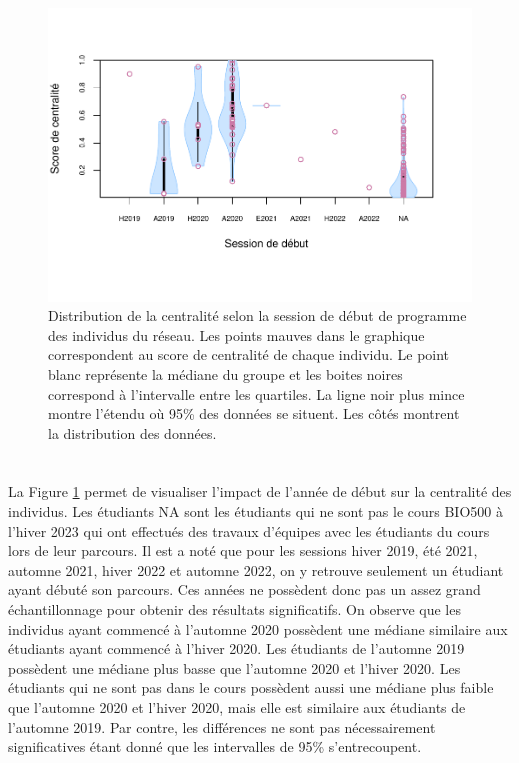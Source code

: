 \documentclass[preprint, 3p,
authoryear]{elsarticle} %
\begin{document}
\begin{figure}
\centering
\includegraphics{rapport_files/figure-latex/unnamed-chunk-2-1.pdf}
\caption{\label{fig:plot2}Distribution de la centralité selon la session
de début de programme des individus du réseau. Les points mauves dans le
graphique correspondent au score de centralité de chaque individu. Le
point blanc représente la médiane du groupe et les boites noires
correspond à l'intervalle entre les quartiles. La ligne noir plus mince
montre l'étendu où 95\% des données se situent. Les côtés montrent la
distribution des données.}
\end{figure}

\hypertarget{section-3}{%
\section{}\label{section-3}}

La Figure \ref{fig:plot2} permet de visualiser l'impact de l'année de
début sur la centralité des individus. Les étudiants NA sont les
étudiants qui ne sont pas le cours BIO500 à l'hiver 2023 qui ont
effectués des travaux d'équipes avec les étudiants du cours lors de leur
parcours. Il est a noté que pour les sessions hiver 2019, été 2021,
automne 2021, hiver 2022 et automne 2022, on y retrouve seulement un
étudiant ayant débuté son parcours. Ces années ne possèdent donc pas un
assez grand échantillonnage pour obtenir des résultats significatifs. On
observe que les individus ayant commencé à l'automne 2020 possèdent une
médiane similaire aux étudiants ayant commencé à l'hiver 2020. Les
étudiants de l'automne 2019 possèdent une médiane plus basse que
l'automne 2020 et l'hiver 2020. Les étudiants qui ne sont pas dans le
cours possèdent aussi une médiane plus faible que l'automne 2020 et
l'hiver 2020, mais elle est similaire aux étudiants de l'automne 2019.
Par contre, les différences ne sont pas nécessairement significatives
étant donné que les intervalles de 95\% s'entrecoupent.
\end{document}

